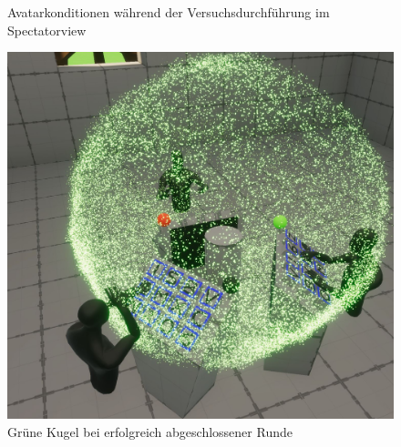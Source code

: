 \documentclass[a4paper,11pt]{article}%
\renewcommand{\\}{\vspace*{0.5\baselineskip} \newline}
\begin{document}
\begin{figure}[h]
  \centering
  \qquad
  \caption{Avatarkonditionen während der Versuchsdurchführung im Spectatorview}
  \label{AvatareImEinsatz}
\end{figure}

\begin{figure}[H]
		\begin{footnotesize}
		\centering
			\includegraphics[scale=0.2]{Abbildungen/RoundSuccsessful.JPG}
			
			\caption[Abbildung 1]{Grüne Kugel bei erfolgreich abgeschlossener Runde}
			\label{RoundFinished}
		\end{footnotesize}
	\end{figure}
\end{document}
